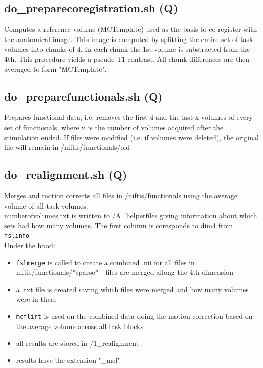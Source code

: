 \documentclass[12pt,a4paper]{scrartcl}
\begin{document}
\subsection{do\_preparecoregistration.sh (Q)}
\label{sh:prepcoreg}
Computes a reference volume (MCTemplate) used as the basis  to co-register with the anatomical image. This image is computed by splitting the entire set of task volumes into chunks of 4. In each chunk the 1st volume is substracted from the 4th. This procedure yields a pseude-T1 contrast. All chunk differences are then averaged to form "MCTemplate".\\

\subsection{do\_preparefunctionals.sh (Q)}
\label{sh:prepfct}
Prepares functional data, i.e. removes the first 4 and the last x volumes of every set of functionals, where x is the number of volumes acquired after the stimulation ended. If files were modified (i.e. if volumes were deleted), the original file will remain in /niftis/functionals/old\\

\subsection{do\_realignment.sh (Q)}
\label{sh:realign}
Merges and motion corrects all files in /niftis/functionals using the average volume of all task volumes.\\

\noindent numberofvolumes.txt is written to /A\_helperfiles giving information about which sets had how many volumes. The first column is coresponds to dim4 from \texttt{fslinfo}\\

\noindent Under the hood:
\begin{itemize}
\item \texttt{fslmerge} is called to create a combined .nii for all files in niftis/functionals/*sparse* - files are merged allong the 4th dimension
\item a .txt file is created saving which files were merged and how many volumes were in there
\item \texttt{mcflirt} is used on the combined data doing the motion correction based on the average volume across all task blocks
\item all results are stored in /1\_realignment
\item results have the extension "\_mcf"
\end{itemize}
\end{document}
